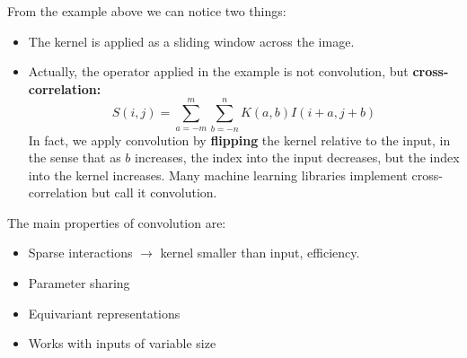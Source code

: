 From the example above we can notice two things:
\begin{itemize}
    \item The kernel is applied as a sliding window across the image.

    \item Actually, the operator applied in the example is not convolution, but \textbf{cross-correlation:}
    \[S(i, j) = \sum_{a = -m}^{m}\sum_{b = -n}^{n}K(a, b)I(i + a, j + b)\]
    In fact, we apply convolution by \textbf{flipping} the kernel relative to the input, in the sense that as $b$ increases, the index into the input decreases, but the index into the kernel increases. Many machine learning libraries implement cross-correlation but call it convolution.
\end{itemize}
The main properties of convolution are:
\begin{itemize}
    \item Sparse interactions $\rightarrow$ kernel smaller than input, efficiency.

    \item Parameter sharing

    \item Equivariant representations

    \item Works with inputs of variable size
\end{itemize}

